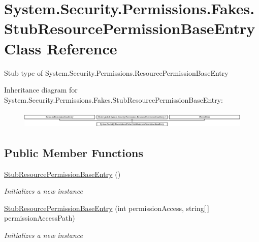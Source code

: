 \hypertarget{class_system_1_1_security_1_1_permissions_1_1_fakes_1_1_stub_resource_permission_base_entry}{\section{System.\-Security.\-Permissions.\-Fakes.\-Stub\-Resource\-Permission\-Base\-Entry Class Reference}
\label{class_system_1_1_security_1_1_permissions_1_1_fakes_1_1_stub_resource_permission_base_entry}
}


Stub type of System.\-Security.\-Permissions.\-Resource\-Permission\-Base\-Entry 


Inheritance diagram for System.\-Security.\-Permissions.\-Fakes.\-Stub\-Resource\-Permission\-Base\-Entry\-:\begin{figure}[H]
\begin{center}
\leavevmode
\includegraphics[height=0.831477cm]{class_system_1_1_security_1_1_permissions_1_1_fakes_1_1_stub_resource_permission_base_entry}
\end{center}
\end{figure}
\subsection*{Public Member Functions}
\begin{DoxyCompactItemize}
\item 
\hyperlink{class_system_1_1_security_1_1_permissions_1_1_fakes_1_1_stub_resource_permission_base_entry_a93c733931f9a71afb09bc68528428548}{Stub\-Resource\-Permission\-Base\-Entry} ()
\begin{DoxyCompactList}\small\item\em Initializes a new instance\end{DoxyCompactList}\item 
\hyperlink{class_system_1_1_security_1_1_permissions_1_1_fakes_1_1_stub_resource_permission_base_entry_a14dc142256558b8b6d84b7ebb70e0ad9}{Stub\-Resource\-Permission\-Base\-Entry} (int permission\-Access, string\mbox{[}$\,$\mbox{]} permission\-Access\-Path)
\begin{DoxyCompactList}\small\item\em Initializes a new instance\end{DoxyCompactList}\end{DoxyCompactItemize}
